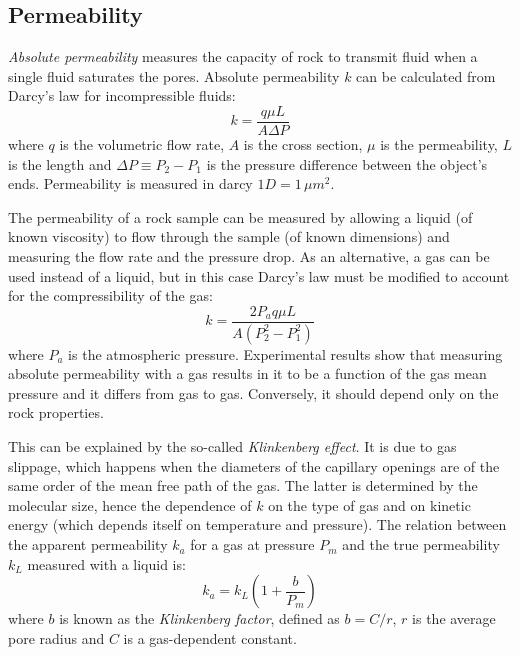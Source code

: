 \documentclass[10pt, a4paper]{amsart}
\begin{document}
\subsection{Permeability}\label{sec:theory:perm}
\textit{Absolute permeability} measures the capacity of rock to transmit fluid when a single fluid saturates the pores. Absolute permeability $k$ can be calculated from Darcy's law for incompressible fluids:
\begin{equation}
    \label{e:darcy}
    k = \frac{q \mu L}{A \Delta P}
\end{equation}
where $q$ is the volumetric flow rate, $A$ is the cross section, $\mu$ is the permeability, $L$ is the length and $\Delta P \equiv P_2 - P_1$ is the pressure difference between the object's ends. Permeability is measured in darcy $1 D = 1 \, \mu m^2$.

The permeability of a rock sample can be measured by allowing a liquid (of known viscosity) to flow through the sample (of known dimensions) and measuring the flow rate and the pressure drop. As an alternative, a gas can be used instead of a liquid, but in this case Darcy's law must be modified to account for the compressibility of the gas:
\begin{equation}
    k = \frac{2 P_a q \mu L}{A (P_2^2 - P_1^2)}
\end{equation}
where $P_a$ is the atmospheric pressure. Experimental results show that measuring absolute permeability with a gas results in it to be a function of the gas mean pressure and it differs from gas to gas. Conversely, it should depend only on the rock properties.

This can be explained by the so-called \textit{Klinkenberg effect}. It is due to gas slippage, which happens when the diameters of the capillary openings are of the same order of the mean free path of the gas. The latter is determined by the molecular size, hence the dependence of $k$ on the type of gas and on kinetic energy (which depends itself on temperature and pressure). The relation between the apparent permeability $k_a$ for a gas at pressure $P_m$ and the true permeability $k_L$ measured with a liquid is:
\begin{equation}\label{eq:Klink}
    k_a = k_L \left( 1 + \frac{b}{P_m}\right)
\end{equation}
where $b$ is known as the \textit{Klinkenberg factor}, defined as $b = C/r$, $r$ is the average pore radius and $C$ is a gas-dependent constant.
\end{document}
